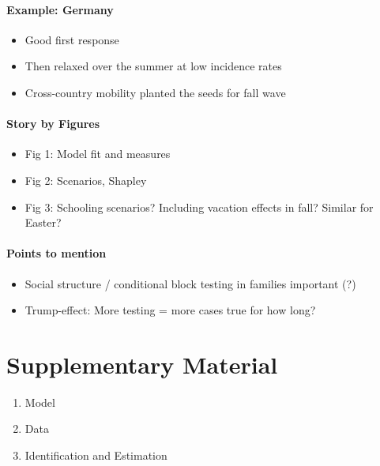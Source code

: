 \paragraph{Example: Germany}
\begin{itemize}
    \item Good first response
    \item Then relaxed over the summer at low incidence rates
    \item Cross-country mobility planted the seeds for fall wave
\end{itemize}

\paragraph{Story by Figures}
\begin{itemize}
    \item Fig 1: Model fit and measures
    \item Fig 2: Scenarios, Shapley
    \item Fig 3: Schooling scenarios? Including vacation effects in fall? Similar for Easter?
\end{itemize}

\paragraph{Points to mention}
\begin{itemize}
    \item Social structure / conditional block testing in families important (?)
    \item Trump-effect: More testing = more cases true for how long?
\end{itemize}







\section{Supplementary Material}

\begin{enumerate}
    \item Model
    \item Data
    \item Identification and Estimation
\end{enumerate}